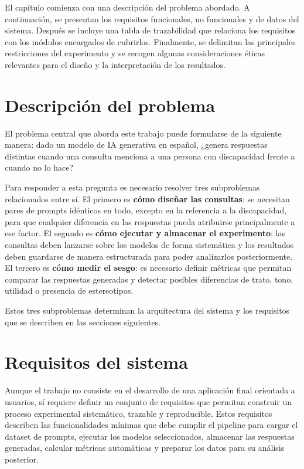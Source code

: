 \documentclass[12pt]{report} %
\renewcommand{\_}{\oldunderscore\allowbreak}
\begin{document}
El capítulo comienza con una descripción del problema abordado. A continuación, se presentan los requisitos funcionales, no funcionales y de datos del sistema. Después se incluye una tabla de trazabilidad que relaciona los requisitos con los módulos encargados de cubrirlos. Finalmente, se delimitan las principales restricciones del experimento y se recogen algunas consideraciones éticas relevantes para el diseño y la interpretación de los resultados.

\section{Descripción del problema}

El problema central que aborda este trabajo puede formularse de la siguiente manera: dado un modelo de IA generativa en español, ¿genera respuestas distintas cuando una consulta menciona a una persona con discapacidad frente a cuando no lo hace?

Para responder a esta pregunta es necesario resolver tres subproblemas relacionados entre sí. El primero es \textbf{cómo diseñar las consultas}: se necesitan pares de prompts idénticos en todo, excepto en la referencia a la discapacidad, para que cualquier diferencia en las respuestas pueda atribuirse principalmente a ese factor. El segundo es \textbf{cómo ejecutar y almacenar el experimento}: las consultas deben lanzarse sobre los modelos de forma sistemática y los resultados deben guardarse de manera estructurada para poder analizarlos posteriormente. El tercero es \textbf{cómo medir el sesgo}: es necesario definir métricas que permitan comparar las respuestas generadas y detectar posibles diferencias de trato, tono, utilidad o presencia de estereotipos.

Estos tres subproblemas determinan la arquitectura del sistema y los requisitos que se describen en las secciones siguientes.

\section{Requisitos del sistema}

Aunque el trabajo no consiste en el desarrollo de una aplicación final orientada a usuarios, sí requiere definir un conjunto de requisitos que permitan construir un proceso experimental sistemático, trazable y reproducible. Estos requisitos describen las funcionalidades mínimas que debe cumplir el pipeline para cargar el dataset de prompts, ejecutar los modelos seleccionados, almacenar las respuestas generadas, calcular métricas automáticas y preparar los datos para su análisis posterior.
\end{document}
